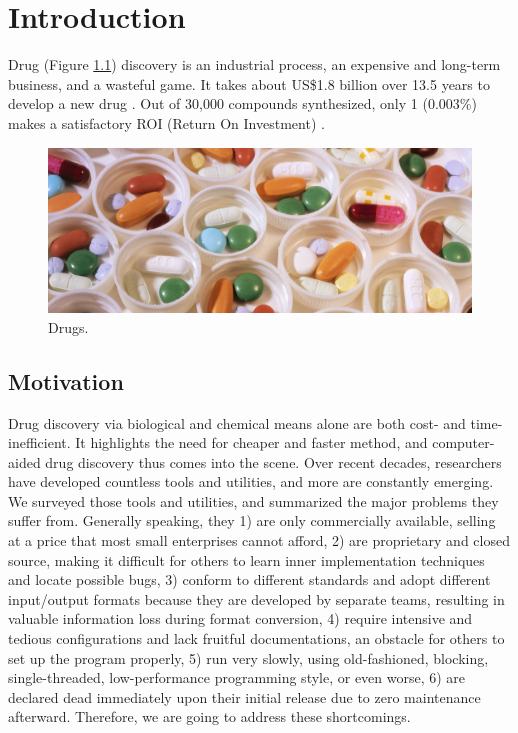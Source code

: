 \chapter{Introduction}

Drug (Figure \ref{Background:Drugs}) discovery is an industrial process, an expensive and long-term business, and a wasteful game. It takes about US\$1.8 billion over 13.5 years to develop a new drug \citep{716}. Out of 30,000 compounds synthesized, only 1 (0.003\%) makes a satisfactory ROI (Return On Investment) \citep{713}.

\begin{figure}
\centering
\includegraphics[width=\textwidth]{Background/Drugs.jpg}
\caption{Drugs.}
\label{Background:Drugs}
\end{figure}

\section{Motivation}

Drug discovery via biological and chemical means alone are both cost- and time-inefficient. It highlights the need for cheaper and faster method, and computer-aided drug discovery thus comes into the scene. Over recent decades, researchers have developed countless tools and utilities, and more are constantly emerging. We surveyed those tools and utilities, and summarized the major problems they suffer from. Generally speaking, they 1) are only commercially available, selling at a price that most small enterprises cannot afford, 2) are proprietary and closed source, making it difficult for others to learn inner implementation techniques and locate possible bugs, 3) conform to different standards and adopt different input/output formats because they are developed by separate teams, resulting in valuable information loss during format conversion, 4) require intensive and tedious configurations and lack fruitful documentations, an obstacle for others to set up the program properly, 5) run very slowly, using old-fashioned, blocking, single-threaded, low-performance programming style, or even worse, 6) are declared dead immediately upon their initial release due to zero maintenance afterward. Therefore, we are going to address these shortcomings.

